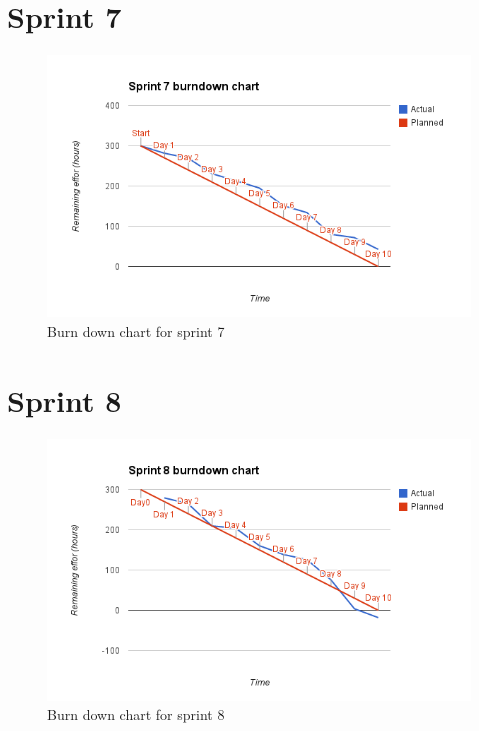 \section{Sprint 7}
\begin{figure}[H]
\includegraphics[width=\textwidth]{appendix/backlog/burndown7.png}
\caption{Burn down chart for sprint 7}
\end{figure}


\section{Sprint 8}
\begin{figure}[H]
\includegraphics[width=\textwidth]{appendix/backlog/burndown8.png}
\caption{Burn down chart for sprint 8}
\end{figure}

